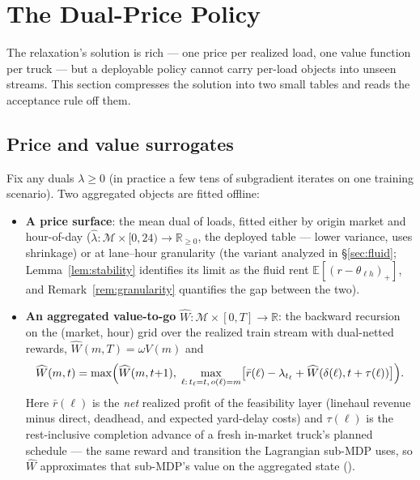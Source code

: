 \documentclass[11pt]{article}
\begin{document}
\section{The Dual-Price Policy}
\label{sec:policy}

The relaxation's solution is rich --- one price per realized load,
one value function per truck --- but a deployable policy cannot carry
per-load objects into unseen streams. This section compresses the
solution into two small tables and reads the acceptance rule off
them.

\subsection{Price and value surrogates}
\label{sec:surrogates}

Fix any duals $\lambda \geq 0$ (in practice a few tens of subgradient
iterates on one training scenario). Two aggregated objects are fitted
offline:

\begin{itemize}
\item \textbf{A price surface}: the mean dual of loads, fitted either
  by origin market and hour-of-day
  ($\hat{\lambda} : \mathcal{M} \times [0, 24) \to \mathbb{R}_{\geq 0}$,
  the deployed table --- lower variance, uses shrinkage) or at
  lane--hour granularity (the variant analyzed in
  \S\ref{sec:fluid}; Lemma~\ref{lem:stability} identifies its limit as
  the fluid rent $\mathbb{E}[(r - \theta_{\ell h})_+]$, and
  Remark~\ref{rem:granularity} quantifies the gap between the two).
\item \textbf{An aggregated value-to-go}
  $\widehat{W} : \mathcal{M} \times [0, T] \to \mathbb{R}$: the backward
  recursion on the (market, hour) grid over the realized train stream
  with dual-netted rewards, $\widehat{W}(m, T) = \omega V(m)$ and
  \begin{equation}
    \widehat{W}(m, t) = \max\Bigl( \widehat{W}(m, t{+}1),\;
    \max_{\ell:\, t_\ell = t,\, o(\ell) = m}
    \bigl[ \bar{r}(\ell) - \lambda_{t_\ell}
    + \widehat{W}(\delta(\ell), t + \tau(\ell)) \bigr] \Bigr).
    \label{eq:wrec}
  \end{equation}
  Here $\bar{r}(\ell)$ is the \emph{net} realized profit of the
  feasibility layer (linehaul revenue minus direct, deadhead, and
  expected yard-delay costs) and $\tau(\ell)$ is the rest-inclusive
  completion advance of a fresh in-market truck's planned schedule ---
  the same reward and transition the Lagrangian sub-MDP uses, so
  $\widehat{W}$ approximates that sub-MDP's value on the aggregated
  state ().
\end{itemize}
\end{document}
